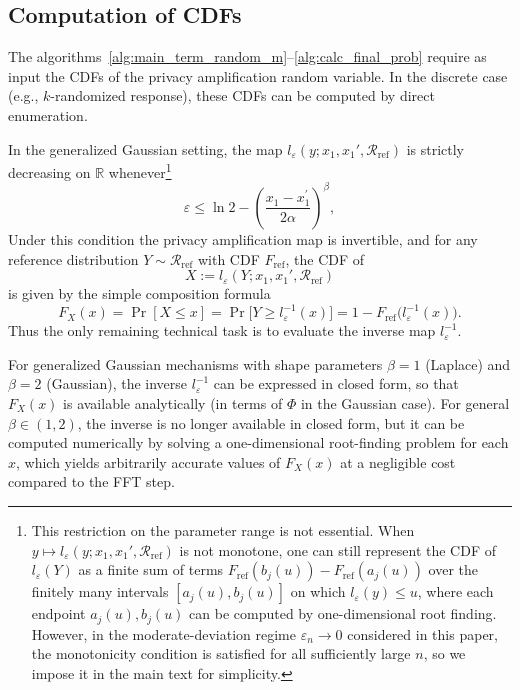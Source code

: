 \documentclass{article}
\theoremstyle{plain}
\theoremstyle{definition}
\begin{document}
\subsection{Computation of CDFs}

The algorithms~\ref{alg:main_term_random_m}--\ref{alg:calc_final_prob}
require as input the CDFs of the privacy amplification random variable.
In the discrete case (e.g., $k$-randomized response), these CDFs can be
computed by direct enumeration. 


In the generalized Gaussian setting, the map $l_\varepsilon(y;x_1,x_1',\mathcal R_{\mathrm{ref}})$ is strictly decreasing on $\mathbb R$ whenever\footnote{%
  This restriction on the parameter range is not essential.
  When $y\mapsto l_\varepsilon(y;x_1,x_1',\mathcal R_{\mathrm{ref}})$ is not monotone,
  one can still represent the CDF of $l_\varepsilon(Y)$ as a finite sum
  of terms $F_{\mathrm{ref}}(b_j(u))-F_{\mathrm{ref}}(a_j(u))$ over the
  finitely many intervals $[a_j(u),b_j(u)]$ on which
  $l_\varepsilon(y)\le u$, where each endpoint $a_j(u),b_j(u)$ can be
  computed by one-dimensional root finding.
  However, in the moderate-deviation regime $\varepsilon_n\to0$
  considered in this paper, the monotonicity condition is satisfied for
  all sufficiently large $n$, so we impose it in the main text for
  simplicity.
}
\[
  \varepsilon \le \ln 2 - \left(\frac{x_1-x_1^\prime}{2\alpha}\right)^\beta,
\]
Under this condition the privacy amplification map is invertible, and
for any reference distribution $Y\sim\mathcal R_{\mathrm{ref}}$ with CDF
$F_{\mathrm{ref}}$, the CDF of
\[
  X := l_\varepsilon(Y;x_1,x_1',\mathcal R_{\mathrm{ref}})
\]
is given by the simple composition formula
\[
  F_X(x)
  = \Pr[X \le x]
  = \Pr\bigl[Y \ge l_\varepsilon^{-1}(x)\bigr]
  = 1 - F_{\mathrm{ref}}\!\bigl(l_\varepsilon^{-1}(x)\bigr).
\]
Thus the only remaining technical task is to evaluate the inverse map
$l_\varepsilon^{-1}$.

For generalized Gaussian mechanisms with shape parameters
$\beta=1$ (Laplace) and $\beta=2$ (Gaussian), the inverse
$l_\varepsilon^{-1}$ can be expressed in closed form, so that
$F_X(x)$ is available analytically (in terms of $\Phi$ in the Gaussian
case). For general $\beta\in(1,2)$, the inverse is no longer available
in closed form, but it can be computed numerically by solving a
one-dimensional root-finding problem for each $x$, which yields
arbitrarily accurate values of $F_X(x)$ at a negligible cost compared
to the FFT step.


\end{document}
